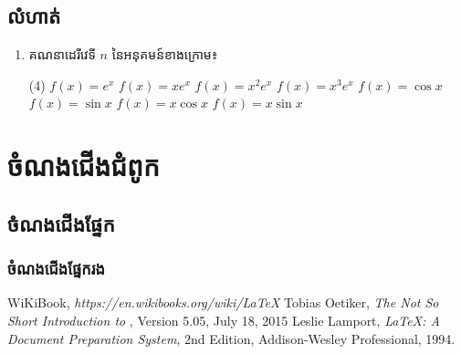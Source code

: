 \documentclass[12pt,a4paper]{book}
\begin{document}
\section*{លំហាត់}
\begin{enumerate}
	\item គណនាដេរីវេទី $ n $ នៃអនុគមន៍ខាងក្រោម៖
	\begin{tasks}(4)
		\task $ f(x)=e^x $
		\task $ f(x)=x e^x $
		\task $ f(x)=x^2 e^x $
		\task $ f(x)=x^3 e^x $
		\task $ f(x)=\cos x $
		\task $ f(x)=\sin x $
		\task $ f(x)=x\cos x $
		\task $ f(x)=x\sin x $
	\end{tasks}
\end{enumerate}
\appendix
\chapter{ចំណងជើងជំពូក}
\section{ចំណងជើងផ្នែក}
\subsection{ចំណងជើងផ្នែករង}
\backmatter
\begin{thebibliography}{3}
	 WiKiBook, \emph{https://en.wikibooks.org/wiki/LaTeX}
	 Tobias Oetiker, \emph{The Not So Short Introduction to \LaTeXe}, Version 5.05, July 18, 2015
	 Leslie Lamport, \emph{\LaTeX: A Document Preparation System}, 2nd Edition, Addison-Wesley Professional, 1994.
\end{thebibliography}
\end{document}
